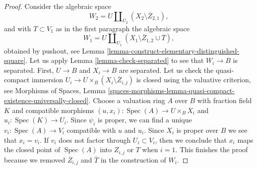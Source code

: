 \documentclass{stacks-project}
\theoremstyle{plain}
\theoremstyle{definition}
\theoremstyle{remark}
\numberwithin{equation}{subsection}
\def\Spec{\mathop{\mathrm{Spec}}}
\begin{document}
\begin{proof}
\medskip\noindent
Consider the algebraic space
$$
W_2 = U \coprod\nolimits_{U_2} (X_2 \setminus \overline{Z}_{2, 1}),
$$
and with $T \subset V_1$ as in the first paragraph the algebraic space
$$
W_1 = U \coprod\nolimits_{U_1}
(X_1 \setminus \overline{Z}_{1, 2} \cup \overline{T}),
$$
obtained by pushout, see
Lemma \ref{lemma-construct-elementary-distinguished-square}.
Let us apply Lemma \ref{lemma-check-separated}
to see that $W_i \to B$ is separated. First,
$U \to B$ and $X_i \to B$ are separated. Let us check the quasi-compact
immersion $U_i \to U \times_B (X_i \setminus \overline{Z}_{i, j})$
is closed using the valuative criterion, see Morphisms of Spaces, Lemma
\ref{spaces-morphisms-lemma-quasi-compact-existence-universally-closed}.
Choose a valuation ring $A$ over $B$ with fraction field $K$ and
compatible morphisms $(u, x_i) : \Spec(A) \to U \times_B X_i$ and
$u_i : \Spec(K) \to U_i$. Since $\psi_i$ is proper, we
can find a unique $v_i : \Spec(A) \to V_i$ compatible with
$u$ and $u_i$. Since $X_i$ is proper over $B$ we see that $x_i = v_i$.
If $v_i$ does not factor through $U_i \subset V_i$, then we conclude
that $x_i$ maps the closed point of $\Spec(A)$ into $Z_{i, j}$ or
$T$ when $i = 1$. This finishes the proof because we removed
$\overline{Z}_{i, j}$ and $\overline{T}$ in the construction of $W_i$.


\end{proof}
\end{document}
